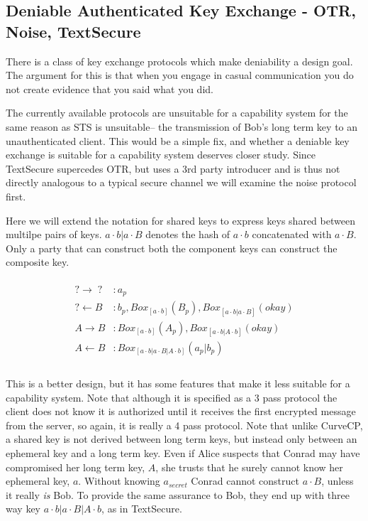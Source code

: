 \documentclass[12pt]{article}
\begin{document}
\subsection{Deniable Authenticated Key Exchange - OTR, Noise, TextSecure}

There is a class of key exchange protocols which make deniability
a design goal\cite{otr, textsecure, noise}. The argument for this is that when you engage in casual
communication you do not create evidence that you said what you did.

The currently available protocols are unsuitable
for a capability system for the same reason as STS is unsuitable--
the transmission of Bob's long term key to an unauthenticated
client. This would be a simple fix, and whether a deniable key exchange
is suitable for a capability system deserves closer study.
Since TextSecure\cite{textsecure} supercedes OTR\cite{otr}, but
uses a 3rd party introducer and is thus not directly analogous to
a typical secure channel we will examine the noise\cite{noise} protocol
first.

Here we will extend the notation for shared keys to express keys shared
between multilpe pairs of keys. $a \cdot b | a \cdot B$ denotes
the hash of $a \cdot b$ concatenated with $a \cdot B$. Only a party
that can construct both the component keys can construct the composite
key.

$$
\begin{align*}
\\
    ? \to \;?\; &: a_p \\
    ? \gets B &: b_p, Box_{[a\cdot b]}(B_p), Box_{[a\cdot b|a\cdot B]}(okay) \\
    A \to B &: Box_{[a\cdot b]}(A_p), Box_{[a\cdot b|A\cdot b]}(okay) \\
    A \gets B &: Box_{[a \cdot b | a \cdot B | A \cdot b]}(a_p|b_p)\\
\\
\end{align*}
$$

This is a better design, but it has some features that make it less
suitable for a capability system. Note that although it is
specified as a 3 pass protocol the client does not know it is authorized
until it receives the first encrypted message from the server,
so again, it is really a 4 pass protocol. Note that unlike CurveCP,
a shared key is not derived between long term keys, but instead only
between an ephemeral key and a long term key.
Even if Alice suspects that Conrad may have compromised her long term
key, $A$, she trusts that he surely cannot know her ephemeral key, $a$.
Without knowing $a_{secret}$ Conrad cannot construct $a\cdot B$, unless
it really \emph{is} Bob. To provide the same assurance to Bob,
they end up with three way key $a \cdot b | a \cdot B | A \cdot b$,
as in TextSecure\cite{textsecure}.
\end{document}
